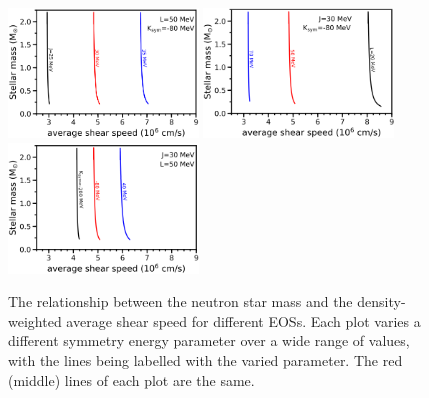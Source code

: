 \documentclass[fleqn,usenatbib]{mnras}
\begin{document}
\begin{figure}
\centering
\includegraphics[width=0.45\textwidth,angle=0]{Mcts_Jvals.png}
\includegraphics[width=0.45\textwidth,angle=0]{Mcts_Lvals.png}
\includegraphics[width=0.45\textwidth,angle=0]{Mcts_Kvals.png}
\caption{The relationship between the neutron star mass and the density-weighted average shear speed for different EOSs. Each plot varies a different symmetry energy parameter over a wide range of values, with the lines being labelled with the varied parameter. The red (middle) lines of each plot are the same.}
\label{fig:Mct_JLK}
\end{figure}
\end{document}
